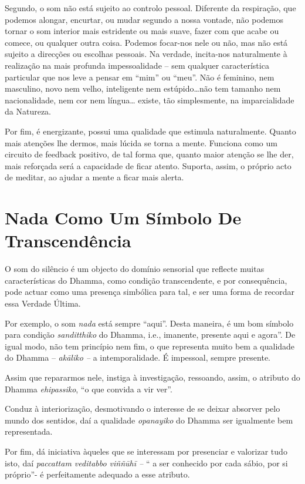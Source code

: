Segundo, o som não está sujeito ao controlo pessoal. Diferente da
respiração, que podemos alongar, encurtar, ou mudar segundo a nossa
vontade, não podemos tornar o som interior mais estridente ou mais
suave, fazer com que acabe ou comece, ou qualquer outra coisa. Podemos
focar-nos nele ou não, mas não está sujeito a direcções ou escolhas
pessoais. Na verdade, incita-nos naturalmente à realização na mais
profunda impessoalidade -- sem qualquer característica particular que
nos leve a pensar em ``mim'' ou ``meu''. Não é feminino, nem masculino,
novo nem velho, inteligente nem estúpido\ldots{}não tem tamanho nem
nacionalidade, nem cor nem língua\ldots{} existe, tão simplesmente, na
imparcialidade da Natureza.

Por fim, é energizante, possui uma qualidade que estimula naturalmente.
Quanto mais atenções lhe dermos, mais lúcida se torna a mente. Funciona
como um circuito de feedback positivo, de tal forma que, quanto maior
atenção se lhe der, mais reforçada será a capacidade de ficar atento.
Suporta, assim, o próprio acto de meditar, ao ajudar a mente a ficar
mais alerta.

\section{Nada Como Um Símbolo De Transcendência}

O som do silêncio é um objecto do domínio sensorial que reflecte muitas
características do Dhamma, como condição transcendente, e por
consequência, pode actuar como uma presença simbólica para tal, e ser
uma forma de recordar essa Verdade Última.

Por exemplo, o som \emph{nada} está sempre ``aqui''. Desta maneira, é um
bom símbolo para condição \emph{sanditthiko} do Dhamma, i.e., imanente,
presente aqui e agora''. De igual modo, não tem princípio nem fim, o que
representa muito bem a qualidade do Dhamma -- \emph{akāliko --} a
intemporalidade. É impessoal, sempre presente.

Assim que repararmos nele, instiga à investigação, ressoando, assim, o
atributo do Dhamma \emph{ehipassiko}, ``o que convida a vir ver''.

Conduz à interiorização, desmotivando o interesse de se deixar absorver
pelo mundo dos sentidos, daí a qualidade \emph{opanayiko} do Dhamma ser
igualmente bem representada.

Por fim, dá iniciativa àqueles que se interessam por presenciar e
valorizar tudo isto, daí \emph{paccattam veditabbo viññūhī --} `` a ser
conhecido por cada sábio, por si próprio''- é perfeitamente adequado a
esse atributo.


